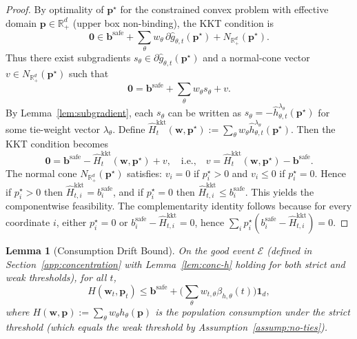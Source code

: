 \documentclass[11pt]{article}
\newtheorem{lemma}[theorem]{Lemma}
\newcommand{\bbS}{\mathbf{b}^{\mathrm{safe}}}
\newcommand{\bp}{\mathbf{p}}
\newcommand{\bw}{\mathbf{w}}
\newcommand{\R}{\mathbb{R}}
\newcommand{\cE}{\mathcal{E}}
\begin{document}
\begin{proof}
By optimality of $\bp^\star$ for the constrained convex problem with effective domain $\bp\in\R_+^d$
(upper box non-binding), the KKT condition is
\[
\mathbf{0}\in \bbS+\sum_{\theta}w_\theta\,\partial \widehat g_{\theta,t}(\bp^\star)+N_{\R_+^d}(\bp^\star).
\]
Thus there exist subgradients $s_\theta\in\partial \widehat g_{\theta,t}(\bp^\star)$ and a normal-cone vector
$v\in N_{\R_+^d}(\bp^\star)$ such that
\[
\mathbf{0}=\bbS+\sum_{\theta}w_\theta s_\theta+v.
\]
By Lemma~\ref{lem:subgradient}, each $s_\theta$ can be written as
$s_\theta=-\widehat h_{\theta,t}^{\lambda_\theta}(\bp^\star)$ for some tie-weight vector $\lambda_\theta$.
Define $\widehat H_t^{\mathrm{kkt}}(\bw,\bp^\star):=\sum_\theta w_\theta \widehat h_{\theta,t}^{\lambda_\theta}(\bp^\star)$.
Then the KKT condition becomes
\[
\mathbf{0}=\bbS-\widehat H_t^{\mathrm{kkt}}(\bw,\bp^\star)+v,
\quad\text{i.e.,}\quad
v=\widehat H_t^{\mathrm{kkt}}(\bw,\bp^\star)-\bbS.
\]
The normal cone $N_{\R_+^d}(\bp^\star)$ satisfies:
$v_i=0$ if $p_i^\star>0$ and $v_i\le 0$ if $p_i^\star=0$.
Hence if $p_i^\star>0$ then $\widehat H_{t,i}^{\mathrm{kkt}}=b_i^{\mathrm{safe}}$, and if $p_i^\star=0$ then
$\widehat H_{t,i}^{\mathrm{kkt}}\le b_i^{\mathrm{safe}}$. This yields the componentwise feasibility.
The complementarity identity follows because for every coordinate $i$,
either $p_i^\star=0$ or $b_i^{\mathrm{safe}}-\widehat H_{t,i}^{\mathrm{kkt}}=0$, hence
$\sum_i p_i^\star(b_i^{\mathrm{safe}}-\widehat H_{t,i}^{\mathrm{kkt}})=0$.
\end{proof}

\begin{lemma}[Consumption Drift Bound]
\label{lem:drift-bound}
On the good event $\cE$ (defined in Section~\ref{app:concentration} with Lemma~\ref{lem:conc-h}
holding for both strict and weak thresholds), for all $t$,
\[
H(\bw_t,\bp_t)\le \bbS+\Big(\sum_{\theta} w_{t,\theta}\beta_{h,\theta}(t)\Big)\mathbf{1}_d,
\]
where $H(\bw,\bp):=\sum_{\theta}w_\theta h_\theta(\bp)$ is the population consumption under the strict threshold
(which equals the weak threshold by Assumption~\ref{assump:no-ties}).
\end{lemma}
\end{document}

